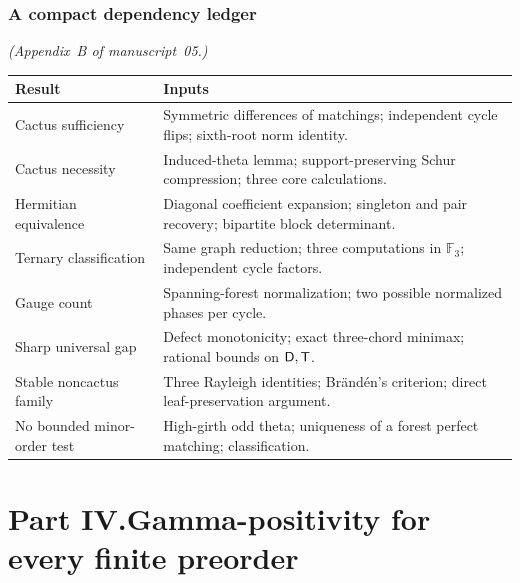 \documentclass[11pt]{article}
\numberwithin{equation}{section}
\theoremstyle{definition}
\newcommand{\F}{\mathbb F}
\begin{document}
\section{A compact dependency ledger}
\label{cac:sec:ledger}
\noindent\emph{(Appendix~B of manuscript~05.)}
\begin{center}
\small
\begin{tabularx}{\textwidth}{@{}p{}Y@{}}\toprule
Result & Inputs\\\midrule
Cactus sufficiency & Symmetric differences of matchings; independent cycle flips; sixth-root norm identity.\\
Cactus necessity & Induced-theta lemma; support-preserving Schur compression; three core calculations.\\
Hermitian equivalence & Diagonal coefficient expansion; singleton and pair recovery; bipartite block determinant.\\
Ternary classification & Same graph reduction; three computations in $\F_3$; independent cycle factors.\\
Gauge count & Spanning-forest normalization; two possible normalized phases per cycle.\\
Sharp universal gap & Defect monotonicity; exact three-chord minimax; rational bounds on $\mathsf D,\mathsf T$.\\
Stable noncactus family & Three Rayleigh identities; Br\"and\'en's criterion; direct leaf-preservation argument.\\
No bounded minor-order test & High-girth odd theta; uniqueness of a forest perfect matching; classification.\\\bottomrule
\end{tabularx}
\end{center}


\clearpage
{}\part*{Part IV.\quad Gamma-positivity for every finite preorder}
\end{document}
